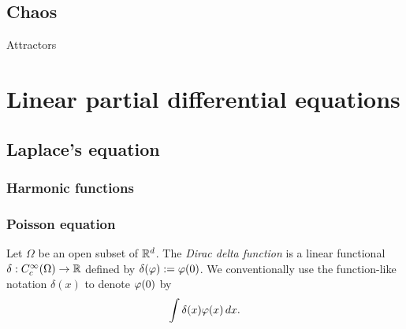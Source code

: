 \documentclass{../note}
\begin{document}
\chapter{Chaos}
Attractors







\part{Linear partial differential equations}


\chapter{Laplace's equation}
\section{Harmonic functions}
\begin{prb}
\end{prb}
\begin{prb}
\end{prb}


\begin{prb}
\end{prb}
\begin{prb}
\end{prb}
\begin{prb}
\end{prb}

\section{Poisson equation}
\begin{prb}

\end{prb}
\begin{prb}
Let $\Omega$ be an open subset of $\mathbb{R}^d$.
The \emph{Dirac delta function} is a linear functional $\delta:C_c^\infty(\Omega)\to\mathbb{R}$ defined by $\delta(\varphi):=\varphi(0)$.
We conventionally use the function-like notation $\delta(x)$ to denote $\varphi(0)$ by
\[\int\delta(x)\varphi(x)\,dx.\]


\end{prb}
\end{document}
